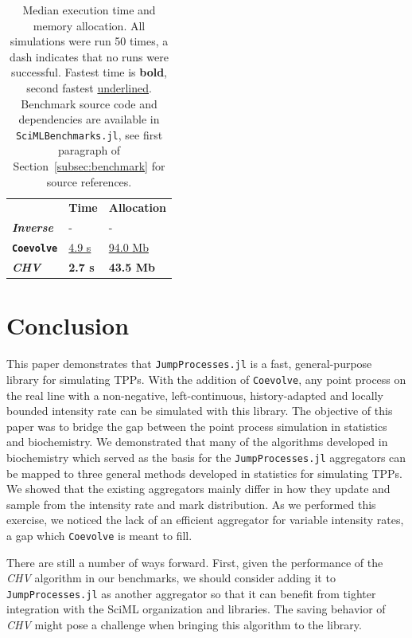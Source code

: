 \documentclass{juliacon}
\numberwithin{equation}{section}
\begin{document}
\begin{table}
\label{tab:benchmark-hawkes}
\end{table}

\begin{table}
\centering
\begin{tabular}{lll}
\toprule
 & \textbf{Time} & \textbf{Allocation}  \\
\cmidrule{1-3}
\textbf{\textit{Inverse}} & -  & - \\
\textbf{\texttt{Coevolve}} & \underline{4.9 s} & \underline{94.0 Mb}  \\
\textbf{\textit{CHV}} & \textbf{2.7 s} & \textbf{43.5 Mb} \\
\bottomrule
\end{tabular}
\caption{Median execution time and memory allocation. All simulations were run 50 times, a dash indicates that no runs were successful. Fastest time is \textbf{bold}, second fastest \underline{underlined}. Benchmark source code and dependencies are available in \texttt{SciMLBenchmarks.jl}, see first paragraph of Section~\ref{subsec:benchmark} for source references.}
\label{tab:benchmark-synapse}
\end{table}

\section{Conclusion}

This paper demonstrates that \texttt{JumpProcesses.jl} is a fast, general-purpose library for simulating TPPs. With the addition of \texttt{Coevolve}, any point process on the real line with a non-negative, left-continuous, history-adapted and locally bounded intensity rate can be simulated with this library. The objective of this paper was to bridge the gap between the point process simulation in statistics and biochemistry. We demonstrated that many of the algorithms developed in biochemistry which served as the basis for the \texttt{JumpProcesses.jl} aggregators can be mapped to three general methods developed in statistics for simulating TPPs. We showed that the existing aggregators mainly differ in how they update and sample from the intensity rate and mark distribution. As we performed this exercise, we noticed the lack of an efficient aggregator for variable intensity rates, a gap which \texttt{Coevolve} is meant to fill.

There are still a number of ways forward. First, given the performance of the \textit{CHV} algorithm in our benchmarks, we should consider adding it to \texttt{JumpProcesses.jl} as another aggregator so that it can benefit from tighter integration with the SciML organization and libraries. The saving behavior of \textit{CHV} might pose a challenge when bringing this algorithm to the library. 
\end{document}
